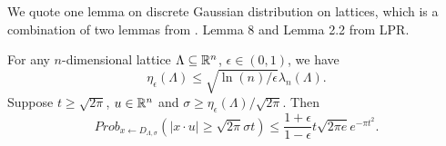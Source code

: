 \documentclass[envcountsect]{llncs}
\begin{document}







\iffalse
We quote one lemma on discrete Gaussian distribution on lattices, which is a combination of two lemmas from \cite{langlois2014worst}. Lemma 8 and Lemma 2.2  from LPR.
\begin{lemma}
\label{lem: last}
For any $n$-dimensional lattice $\Lambda \subseteq \mathbb{R}^n$, $\epsilon \in (0,1)$, we have
$$\eta_\epsilon(\Lambda) \leq \sqrt{\ln(n)/\epsilon} \lambda_n(\Lambda).$$
Suppose $t \geq \sqrt{2 \pi}$, $u \in \mathbb{R}^n$ and $\sigma \geq \eta_\epsilon(\Lambda)/\sqrt{2 \pi}$. Then
\[
    Prob_{x \gets D_{\Lambda,\sigma}}(|x \cdot u| \geq \sqrt{2 \pi}\sigma t) \leq \frac{1+\epsilon}{1-\epsilon} t \sqrt{2 \pi e} e^{- \pi t^2}.
\]
\end{lemma}
\end{document}
